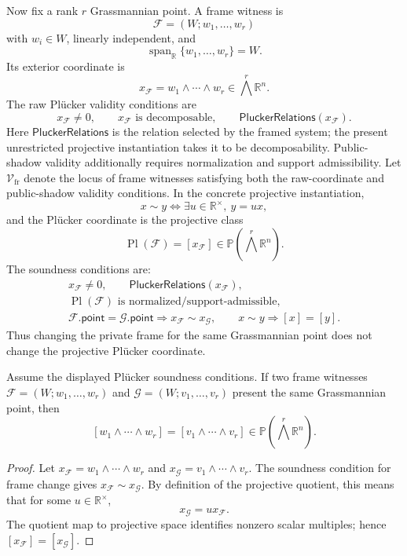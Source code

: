 Now fix a rank \(r\) Grassmannian point. A frame witness is
\[
  \mathcal F=(W;w_1,\ldots,w_r)
\]
with \(w_i\in W\), linearly independent, and
\[
  \operatorname{span}_{\mathbb R}\{w_1,\ldots,w_r\}=W.
\]
Its exterior coordinate is
\[
  x_{\mathcal F}=w_1\wedge\cdots\wedge w_r
  \in \bigwedge^r\mathbb R^n.
\]
The raw Pl\"ucker validity conditions are
\[
  x_{\mathcal F}\ne 0,\qquad
  x_{\mathcal F}\text{ is decomposable},\qquad
  \mathsf{PluckerRelations}(x_{\mathcal F}).
\]
Here \(\mathsf{PluckerRelations}\) is the relation selected by the framed
system; the present unrestricted projective instantiation takes it to be
decomposability. Public-shadow validity additionally requires normalization and
support admissibility. Let \(\mathcal V_{\mathrm{fr}}\) denote the locus of
frame witnesses satisfying both the raw-coordinate and public-shadow validity
conditions.
In the concrete projective instantiation,
\[
  x\sim y
  \Longleftrightarrow
  \exists u\in\mathbb R^\times,\ y=u x,
\]
and the Pl\"ucker coordinate is the projective class
\[
  \operatorname{Pl}(\mathcal F)=[x_{\mathcal F}]
  \in \mathbb P\!\left(\bigwedge^r\mathbb R^n\right).
\]
The soundness conditions are:
\[
\begin{gathered}
  x_{\mathcal F}\ne 0,\qquad
  \mathsf{PluckerRelations}(x_{\mathcal F}),\\
  \operatorname{Pl}(\mathcal F)\text{ is normalized/support-admissible},\\
  \mathcal F.\mathsf{point}=\mathcal G.\mathsf{point}
    \Longrightarrow x_{\mathcal F}\sim x_{\mathcal G},\qquad
  x\sim y\Longrightarrow [x]=[y].
\end{gathered}
\]
Thus changing the private frame for the same Grassmannian point does not change
the projective Pl\"ucker coordinate.

\begin{proposition}\label{prop:plucker-invariance}
Assume the displayed Pl\"ucker soundness conditions. If two frame witnesses
\(\mathcal F=(W;w_1,\ldots,w_r)\) and
\(\mathcal G=(W;v_1,\ldots,v_r)\) present the same Grassmannian point, then
\[
  [w_1\wedge\cdots\wedge w_r]
  =
  [v_1\wedge\cdots\wedge v_r]
  \in \mathbb P\!\left(\bigwedge^r\mathbb R^n\right).
\]
\end{proposition}

\begin{proof}
Let \(x_{\mathcal F}=w_1\wedge\cdots\wedge w_r\) and
\(x_{\mathcal G}=v_1\wedge\cdots\wedge v_r\). The soundness condition for
frame change gives \(x_{\mathcal F}\sim x_{\mathcal G}\). By definition of the
projective quotient, this means that for some \(u\in\mathbb R^\times\),
\[
  x_{\mathcal G}=u x_{\mathcal F}.
\]
The quotient map to projective space identifies nonzero scalar multiples; hence
\([x_{\mathcal F}]=[x_{\mathcal G}]\).
\end{proof}

